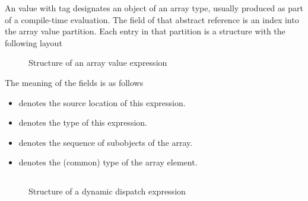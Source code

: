 An  value with tag  designates an object of an array type, usually produced as part of a compile-time evaluation.
The  field of that abstract reference is an index into the array value partition.  Each entry in that partition is a structure with the following layout
%
\begin{figure}[H]
	\centering
	\caption{Structure of an array value expression}
	\label{fig:ifc:ExprSort:ArrayValue}
\end{figure}
%
The meaning of the fields is as follows
\begin{itemize}
	\item {} denotes the source location of this expression.
	\item {} denotes the type of this expression.
	\item {} denotes the sequence of subobjects of the array.
	\item {} denotes the (common) type of the array element.
\end{itemize}


\subsection{}
\label{sec:ifc:ExprSort:DynamicDispatch}

\begin{figure}[H]
	\centering
	\caption{Structure of a dynamic dispatch expression}
	\label{fig:ifc-dynamic-dispatch-structure}
\end{figure}



\subsection{}
\label{sec:ifc:ExprSort:VirtualFunctionConversion}

